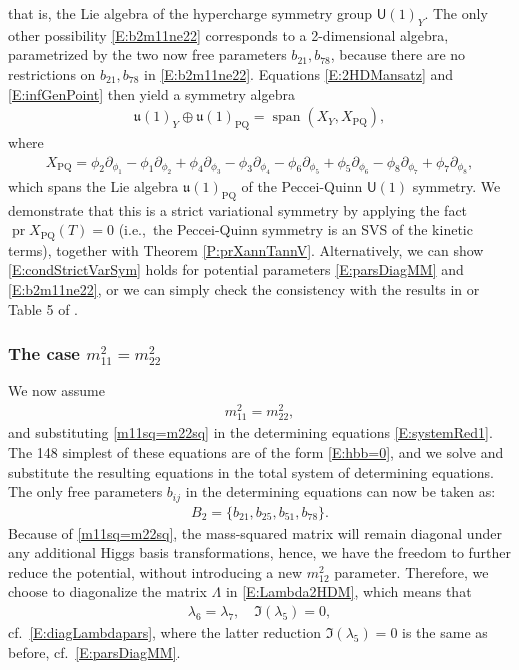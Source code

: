 \documentclass[a4paper,hidelinks, 12pt]{article}
\numberwithin{equation}{section}
\theoremstyle{plain}
\newcommand{\La}{\mathfrak}
\newcommand{\Lg}{\mathsf}
\newcommand{\on}{\operatorname}
\begin{document}
that is, the Lie algebra of the hypercharge symmetry group $\Lg{U}(1)_Y$.
The only other possibility \eqref{E:b2m11ne22} corresponds to a 2-dimensional algebra, parametrized by the two now free parameters 
$b_{21}, b_{78}$, because there are no restrictions on $b_{21}, b_{78}$ in \eqref{E:b2m11ne22}. Equations \eqref{E:2HDMansatz} and \eqref{E:infGenPoint} then yield a symmetry algebra
\begin{align}
	\La{u}(1)_Y \oplus \La{u}(1)_\text{PQ}=\on{span}(X_Y,X_\text{PQ}),
\end{align}
where
\begin{align}\label{E:PQgen2HDM}
X_\text{PQ}= \phi_2 \partial_{\phi_1}-\phi_1 \partial_{\phi_2}+\phi_4\partial_{\phi_3}-\phi_3\partial_{\phi_4}-\phi_6\partial_{\phi_5}+\phi_5\partial_{\phi_6}-\phi_8\partial_{\phi_7}+\phi_7\partial_{\phi_8},
\end{align}
which spans the Lie algebra $\La{u}(1)_\text{PQ}$ of the Peccei-Quinn $\Lg{U}(1)$ symmetry. We demonstrate that this is a strict variational symmetry by applying the fact 
$\on{pr}X_\text{PQ}(T)=0$ (i.e.,~the Peccei-Quinn symmetry is an SVS of the kinetic terms), together with Theorem \ref{P:prXannTannV}. Alternatively, we can show
\eqref{E:condStrictVarSym} holds for potential parameters \eqref{E:parsDiagMM} and \eqref{E:b2m11ne22}, or we can simply check the consistency with the results in \cite{PhysRevD.77.015017} or 
Table 5 of \cite{Branco_2012}. 

\subsubsection{The case $m_{11}^2= m_{22}^2$}
\label{sec:TheCaseM112M222}
We now assume
\begin{align}\label{m11sq=m22sq}
	m_{11}^2= m_{22}^2,
\end{align}
and substituting \eqref{m11sq=m22sq} in the determining equations \eqref{E:systemRed1}. The 148 simplest of these equations are of the form
\eqref{E:hbb=0}, and we solve and substitute the resulting 
equations in the total system of determining equations.
 The only free parameters $b_{ij}$ in the determining equations can now be taken as:
 \begin{align}\label{E:B22HDM}
B_2=\{b_{21},b_{25}, b_{51}, b_{78}\}.	 
 \end{align}
Because of \eqref{m11sq=m22sq}, the mass-squared matrix will remain diagonal under any additional Higgs basis transformations, hence, we have the freedom to further reduce the potential, without introducing a new $m_{12}^2$ parameter. 
Therefore, we choose to diagonalize the matrix $\Lambda$ in \eqref{E:Lambda2HDM}, 
which means that
\begin{align}\label{E:parsDiagLambda}
	\lambda_6=\lambda_7, \quad \Im(\lambda_5)=0,
\end{align}
cf.~\eqref{E:diagLambdapars}, where the latter reduction $\Im(\lambda_5)=0$ is the same as before, cf.~\eqref{E:parsDiagMM}.
\end{document}

